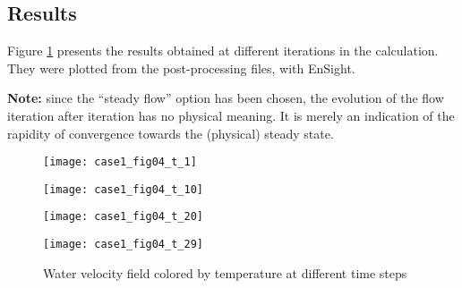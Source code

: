         \subsection{Results}

Figure \ref{fige1_e1} presents the results obtained at different iterations in the
calculation. They were plotted from the post-processing files, with EnSight.

\textbf{Note:} since the ``steady flow'' option has been chosen, the evolution
of the flow iteration after iteration has no physical meaning. It is merely an
indication of the rapidity of convergence towards the (physical) steady state.

\begin{figure}[h]
\parbox{0.5\textwidth}{%
\texttt{[image: case1\_fig04\_t\_1]}}
\parbox{0.5\textwidth}{%
\texttt{[image: case1\_fig04\_t\_10]}}
\vspace*{0.5cm}
\parbox{0.5\textwidth}{%
\texttt{[image: case1\_fig04\_t\_20]}}
\parbox{0.5\textwidth}{%
\texttt{[image: case1\_fig04\_t\_29]}}
\caption{\label{fige1_e1}Water velocity field colored by temperature at different time steps}
\end{figure}


